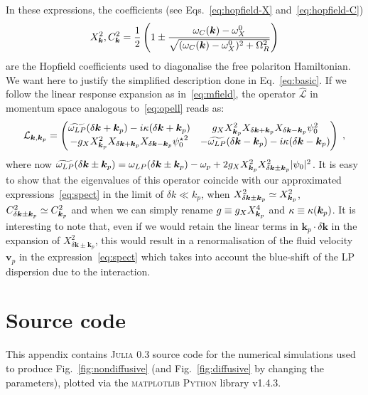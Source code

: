 \begin{subappendices}
In these expressions, the coefficients (see Eqs.~\eqref{eq:hopfield-X}
and~\eqref{eq:hopfield-C}) 
%
\begin{equation}
  X^2_{\bm{k}}, C^2_{\bm{k}} = \frac{1}{2} \left(1 \pm \frac{\omega_C(\bm{k}) -
    \omega_X^0}{\sqrt{(\omega_C(\bm{k}) - \omega_X^0)^2 +
      \Omega_R^2}}\right)
\end{equation}
%
are the Hopfield coefficients used to diagonalise the free polariton
Hamiltonian. We want here to justify the simplified description done
in Eq.~\eqref{eq:basic}. If we follow the linear response expansion as
in~\eqref{eq:mfield}, the operator $\hat{\mathcal{L}}$ in momentum
space analogous to~\eqref{eq:opell} reads as:
%
\begin{equation}
  \mathcal{L}_{\bm{k},\bm{k}_p} = \begin{pmatrix}
    \widetilde{\omega_{LP}} (\delta \bm{k}+\bm{k}_p) - i
    \kappa(\delta \bm{k}+\bm{k}_p) & g_X X_{\bm{k}_p}^2 X_{\delta
      \bm{k}+\bm{k}_p} X_{\delta \bm{k}-\bm{k}_p} \psi_0^2
    \\ - g_X X_{\bm{k}_p}^2 X_{\delta \bm{k}+\bm{k}_p} X_{\delta
      \bm{k}-\bm{k}_p}{\psi_0^{\star}}^2 & -
    \widetilde{\omega_{LP}}(\delta \bm{k}-\bm{k}_p) -
    i\kappa(\delta \bm{k}-\bm{k}_p) \end{pmatrix}\; ,
\label{eq:opel2}
\end{equation}
%
where now $\widetilde{\omega_{LP}} (\delta \bm{k} \pm\bm{k}_p) =
\omega_{LP} (\delta \bm{k} \pm\bm{k}_p) -\omega_p + 2 g_X X_{\bm{k}_p}^2
X_{\delta \bm{k} \pm \bm{k}_p}^2 |\psi_0|^2$. It is easy to show that
the eigenvalues of this operator coincide with our approximated
expressions~\eqref{eq:spect} in the limit of $\delta k \ll k_p$,
when $X_{\delta \bm{k} \pm \bm{k}_p}^2 \simeq X_{\bm{k}_p}^2$, $C_{\delta
\bm{k} \pm \bm{k}_p}^2 \simeq C_{\bm{k}_p}^2$ and when we can simply
rename $g \equiv g_X X_{\bm{k}_p}^4$ and $\kappa \equiv
\kappa(\bm{k}_p)$. It is interesting to note that, even if we would
retain the linear terms in $\bm{k}_p \cdot \delta \bm{k}$ in the
expansion of $X_{\delta \bm{k} \pm \bm{k}_p}^2$, this would result in
a renormalisation of the fluid velocity $\bm{v}_p$ in the
expression~\eqref{eq:spect} which takes into account the blue-shift of
the LP dispersion due to the interaction.


\section{Source code}\label{sec:source-code-landau}
% 
This appendix contains \textsc{Julia} 0.3 source code for the
numerical simulations used to produce Fig.~\ref{fig:nondiffusive} (and
Fig.~\ref{fig:diffusive} by changing the parameters), plotted via the
\textsc{matplotlib} \textsc{Python} library v1.4.3.
% 

\end{subappendices}


